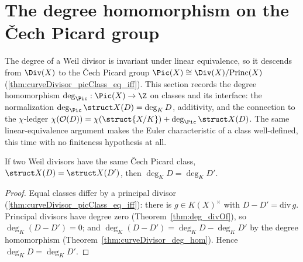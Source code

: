 \section{The degree homomorphism on the \v Cech Picard group}

The degree of a Weil divisor is invariant under linear equivalence, so it descends from
\(\Div(X)\) to the \v Cech Picard group \(\Pic(X) \cong \Div(X)/\mathrm{Princ}(X)\)
(\ref{thm:curveDivisor_picClass_eq_iff}). This section records the degree homomorphism
\(\deg_{\Pic} : \Pic(X) \to \Z\) on classes and its interface: the normalization \(\deg_{\Pic}
\struct X(D) = \deg_K D\), additivity, and the connection to the \(\chi\)-ledger
\(\chi(\mathcal O(D)) = \chi(\struct{X/K}) + \deg_{\Pic}\struct X(D)\). The same linear-equivalence
argument makes the Euler characteristic of a class well-defined, this time with no finiteness
hypothesis at all.

\begin{lemma}
  \label{lem:deg_eq_deg_of_picClass_eq}
  \leanok
  If two Weil divisors have the same \v Cech Picard class, \(\struct X(D) = \struct X(D')\), then
  \(\deg_K D = \deg_K D'\).
\end{lemma}
\begin{proof}
  \leanok
  Equal classes differ by a principal divisor (\ref{thm:curveDivisor_picClass_eq_iff}): there is
  \(g \in K(X)^\times\) with \(D - D' = \mathrm{div}\, g\). Principal divisors have degree zero
  (Theorem~\ref{thm:deg_divOf}), so \(\deg_K(D - D') = 0\); and \(\deg_K(D - D') = \deg_K D -
  \deg_K D'\) by the degree homomorphism (Theorem~\ref{thm:curveDivisor_deg_hom}). Hence
  \(\deg_K D = \deg_K D'\).
\end{proof}

